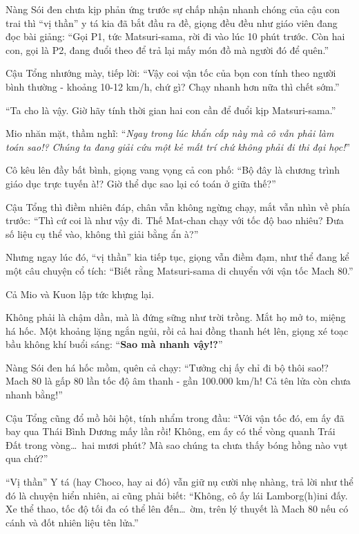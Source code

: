 \documentclass[../main.tex]{subfiles}
\begin{document}
Nàng Sói đen chưa kịp phản ứng trước sự chấp nhận nhanh chóng của cậu con trai thì ``vị thần'' y tá kia đã bắt đầu ra đề, giọng đều đều như giáo viên đang đọc bài giảng: ``Gọi P1, tức Matsuri-sama, rời đi vào lúc 10 phút trước. Còn hai con, gọi là P2, đang đuổi theo để trả lại mấy món đồ mà người đó để quên.''


Cậu Tổng nhướng mày, tiếp lời: ``Vậy coi vận tốc của bọn con tính theo người bình thường - khoảng 10-12 km/h, chứ gì? Chạy nhanh hơn nữa thì chết sớm.''

``Ta cho là vậy. Giờ hãy tính thời gian hai con cần để đuổi kịp Matsuri-sama.''

Mio nhăn mặt, thầm nghĩ: ``\textit{Ngay trong lúc khẩn cấp này mà cô vẫn phải làm toán sao!? Chúng ta đang giải cứu một kẻ mất trí chứ không phải đi thi đại học!}''

Cô kêu lên đầy bất bình, giọng vang vọng cả con phố: ``Bộ đây là chương trình giáo dục trực tuyến à!? Giờ thể dục sao lại có toán ở giữa thế?''

Cậu Tổng thì điềm nhiên đáp, chân vẫn không ngừng chạy, mắt vẫn nhìn về phía trước: ``Thì cứ coi là như vậy đi. Thế Mat-chan chạy với tốc độ bao nhiêu? Đưa số liệu cụ thể vào, không thì giải bằng ẩn à?''

Nhưng ngay lúc đó, ``vị thần'' kia tiếp tục, giọng vẫn điềm đạm, như thể đang kể một câu chuyện cổ tích: ``Biết rằng Matsuri-sama di chuyển với vận tốc Mach 80.''

Cả Mio và Kuon lập tức khựng lại.

Không phải là chậm dần, mà là đứng sững như trời trồng. Mắt họ mở to, miệng há hốc. Một khoảng lặng ngắn ngủi, rồi cả hai đồng thanh hét lên, giọng xé toạc bầu không khí buổi sáng: ``\textbf{Sao mà nhanh vậy!?}''

Nàng Sói đen há hốc mồm, quên cả chạy: ``Tưởng chị ấy chỉ đi bộ thôi sao!? Mach 80 là gấp 80 lần tốc độ âm thanh - gần 100.000 km/h! Cả tên lửa còn chưa nhanh bằng!''

Cậu Tổng cũng đổ mồ hôi hột, tính nhẩm trong đầu: ``Với vận tốc đó, em ấy đã bay qua Thái Bình Dương mấy lần rồi! Không, em ấy có thể vòng quanh Trái Đất trong vòng\dots\ hai mươi phút? Mà sao chúng ta chưa thấy bóng hồng nào vụt qua chứ?''

``Vị thần'' Y tá (hay Choco, hay ai đó) vẫn giữ nụ cười nhẹ nhàng, trả lời như thể đó là chuyện hiển nhiên, ai cũng phải biết: ``Không, cô ấy lái Lamborg(h)ini đấy. Xe thể thao, tốc độ tối đa có thể lên đến\dots\ ờm, trên lý thuyết là Mach 80 nếu có cánh và đốt nhiên liệu tên lửa.''
\end{document}
